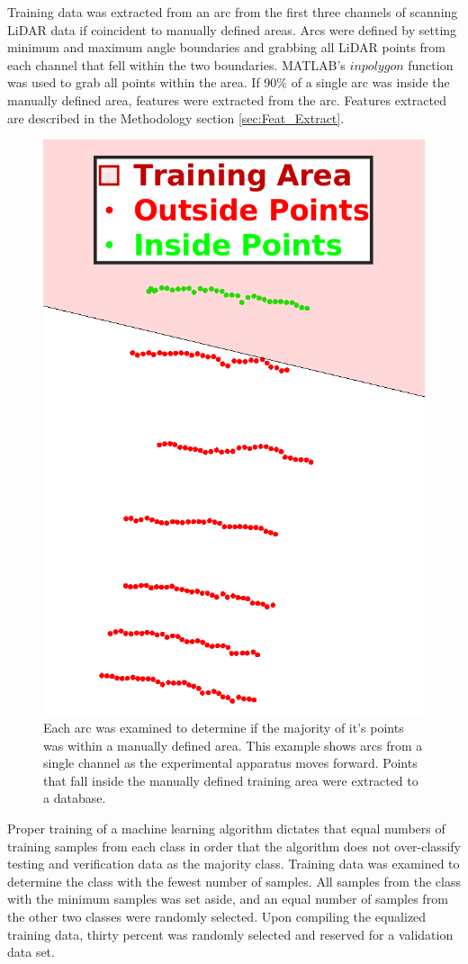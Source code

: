\documentclass[numbered,pdftex]{ohio-etd}
\begin{document}
{{		{Training data was extracted from an arc from the first three channels of scanning LiDAR data if coincident to manually defined areas. Arcs were defined by setting minimum and maximum angle boundaries and grabbing all LiDAR points from each channel that fell within the two boundaries. MATLAB's $inpolygon$ function was used to grab all points within the area. If 90\% of a single arc was inside the manually defined area, features were extracted from the arc. Features extracted are described in the Methodology section \ref{sec:Feat_Extract}.} 
		
		\begin{figure}[H]
			\centering
			\includegraphics[width=0.5\linewidth]{Defense_Images/arc_in_mca_or_not}
			\caption[Coincident Point Example]{Each arc was examined to determine if the majority of it's points was within a manually defined area. This example shows arcs from a single channel as the experimental apparatus moves forward. Points that fall inside the manually defined training area were extracted to a database. }
			\label{fig:arc_in_mca_or_not}
		\end{figure}
		
		{Proper training of a machine learning algorithm dictates that equal numbers of training samples from each class in order that the algorithm does not over-classify testing and verification data as the majority class. Training data was examined to determine the class with the fewest number of samples. All samples from the class with the minimum samples was set aside, and an equal number of samples from the other two classes were randomly selected. Upon compiling the equalized training data, thirty percent was randomly selected and reserved for a validation data set.}
		
}}
\end{document}
